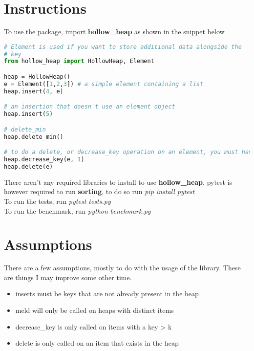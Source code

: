\documentclass[10pt]{article}
\begin{document}
\section*{Instructions}
To use the package, import \textbf{hollow\_heap} as shown in the snippet below

\begin{lstlisting}[language=Python]
# Element is used if you want to store additional data alongside the
# key
from hollow_heap import HollowHeap, Element

heap = HollowHeap()
e = Element([1,2,3]) # a simple element containing a list
heap.insert(4, e)

# an insertion that doesn't use an element object
heap.insert(5)

# delete_min
heap.delete_min()

# to do a delete, or decrease_key operation on an element, you must have the element initialized somewhere
heap.decrease_key(e, 1)
heap.delete(e)
\end{lstlisting}

There aren't any required libraries to install to use \textbf{hollow\_heap}, pytest is however required to run \textbf{sorting}, to do so run \emph{pip install pytest}\\

To run the tests, run \emph{pytest tests.py}\\

To run the benchmark, run \emph{python benchmark.py}\\

\section*{Assumptions}
There are a few assumptions, mostly to do with the usage of the library. These are things I may improve some other time.\\
\begin{itemize}
    \item inserts must be keys that are not already present in the heap
    \item meld will only be called on heaps with distinct items
    \item decrease\_key is only called on items with a key > k
    \item delete is only called on an item that exists in the heap
\end{itemize}
\end{document}
